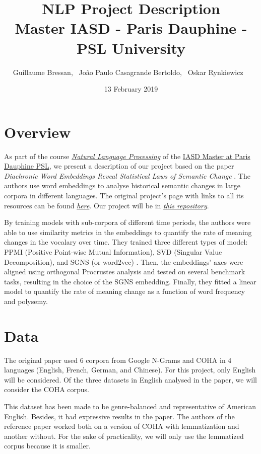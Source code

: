 \documentclass[11pt, twocolumn]{extarticle}
\title{
    \Huge NLP Project Description \\ \medskip 
    \large Master IASD - Paris Dauphine - PSL University
}
\author{
    Guillaume Bressan, \
    João Paulo Casagrande Bertoldo, \
    Oskar Rynkiewicz \ 
}
\date{13 February 2019}
\begin{document}
\maketitle

\section{Overview}

As part of the course \href{https://allauzen.github.io/cours/NLP_IASD/}{\textit{Natural Language Processing}} of the \href{https://www.lamsade.dauphine.fr/wp/iasd/en/}{IASD Master at Paris Dauphine PSL}, we present a description of our project based on the paper \textit{Diachronic Word Embeddings Reveal Statistical Laws of Semantic Change} \cite{hamilton-etal-2016-diachronic}. The authors use word embeddings to analyse historical semantic changes in large corpora in different languages. The original project's page with links to all its resources can be found \href{https://nlp.stanford.edu/projects/histwords/data_description.html}{\textit{here}}. Our project will be in \href{https://github.com/joaopcbertoldo/jokar}{\textit{this repository}}.
\par

By training models with sub-corpora of different time periods, the authors were able to use similarity metrics in the embeddings to quantify the rate of meaning changes in the vocalary over time. They trained three different types of model: PPMI (Positive Point-wise Mutual Information), SVD (Singular Value Decomposition), and SGNS (or word2vec) \cite{mikolov2013distributed}. Then, the embeddings' axes were aligned using orthogonal Procrustes analysis and tested on several benchmark tasks, resulting in the choice of the SGNS embedding. Finally, they fitted a linear model to quantify the rate of meaning change as a function of word frequency and polysemy.

\section{Data}

The original paper used 6 corpora from Google N-Grams \cite{google-n-grams} and COHA \cite{coha} in 4 languages (English, French, German, and Chinese). For this project, only English will be considered. Of the three datasets in English analysed in the paper, we will consider the COHA corpus. 
\par 

This dataset has been made to be genre-balanced and representative of American English. Besides, it had expressive results in the paper. The authors of the reference paper worked both on a version of COHA with lemmatization and another without. For the sake of practicality, we will only use the lemmatized corpus because it is smaller. 
\par
\end{document}
